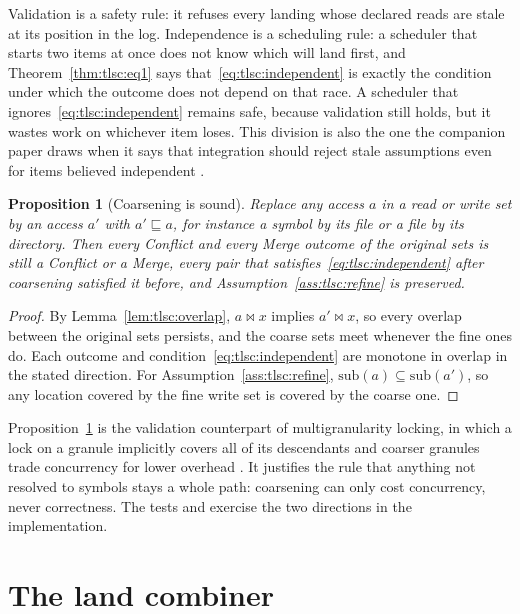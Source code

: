 \documentclass[11pt,letterpaper]{article}
\newtheorem{proposition}[theorem]{Proposition}
\theoremstyle{definition}
\theoremstyle{remark}
\newcommand{\meets}{\bowtie}
\newcommand{\cov}{\sqsubseteq}
\begin{document}
Validation is a safety rule: it refuses every landing whose declared reads are stale at its position in the log. Independence is a scheduling rule: a scheduler that starts two items at once does not know which will land first, and Theorem~\ref{thm:tlsc:eq1} says that~\eqref{eq:tlsc:independent} is exactly the condition under which the outcome does not depend on that race. A scheduler that ignores~\eqref{eq:tlsc:independent} remains safe, because validation still holds, but it wastes work on whichever item loses. This division is also the one the companion paper draws when it says that integration should reject stale assumptions even for items believed independent \cite{long2026inversion}.

\begin{proposition}[Coarsening is sound]
\label{prop:tlsc:coarsening}
Replace any access $a$ in a read or write set by an access $a'$ with $a'\cov a$, for instance a symbol by its file or a file by its directory. Then every Conflict and every Merge outcome of the original sets is still a Conflict or a Merge, every pair that satisfies~\eqref{eq:tlsc:independent} after coarsening satisfied it before, and Assumption~\ref{ass:tlsc:refine} is preserved.
\end{proposition}

\begin{proof}
By Lemma~\ref{lem:tlsc:overlap}, $a\meets x$ implies $a'\meets x$, so every overlap between the original sets persists, and the coarse sets meet whenever the fine ones do. Each outcome and condition~\eqref{eq:tlsc:independent} are monotone in overlap in the stated direction. For Assumption~\ref{ass:tlsc:refine}, $\mathrm{sub}(a)\subseteq\mathrm{sub}(a')$, so any location covered by the fine write set is covered by the coarse one.
\end{proof}

Proposition~\ref{prop:tlsc:coarsening} is the validation counterpart of multigranularity locking, in which a lock on a granule implicitly covers all of its descendants and coarser granules trade concurrency for lower overhead \cite[Section 3.9]{bhg1987}. It justifies the rule that anything not resolved to symbols stays a whole path: coarsening can only cost concurrency, never correctness. The tests  and  exercise the two directions in the implementation.

\section{The land combiner}
\label{sec:tlsc:combiner}
\end{document}
